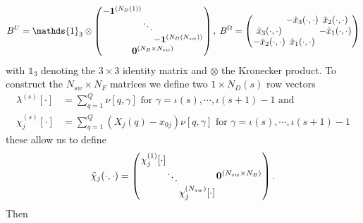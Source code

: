 \begin{equation*}
\arraycolsep=0.4pt\def\arraystretch{1}
    B^U = \mathds{1}_{3} \otimes \left(\begin{array}{c}
         \begin{array}{ccc}
             -\bm{1}^{(N_D(1))} & & \\
              & \ddots & \\
              & & -\bm{1}^{(N_D(N_{sw}))}
         \end{array}\\
         \bm{0}^{(N_B \times N_{sw})}
    \end{array}\right), \;
    B^\Omega =
    \left(\begin{array}{ccc}
             & -\tilde{x}_3(\cdot,\cdot) & \tilde{x}_2(\cdot,\cdot)\\
            \tilde{x}_3(\cdot,\cdot) & & -\tilde{x}_1(\cdot,\cdot)\\
            -\tilde{x}_2(\cdot,\cdot) & \tilde{x}_1(\cdot,\cdot) &
          \end{array}\right)
\end{equation*}
with $\mathds{1}_{3}$ denoting the $3\times3$ identity matrix and $\otimes$ the Kronecker product.
To construct the $N_{sw} \times N_F$ matrices we define two $1 \times N_D(s)$ row vectors
\begin{equation*}
\begin{aligned}
    \lambda^{(s)}[\cdot] &= \sum_{q=1}^Q \nu[q,\gamma] \text{ for } \gamma = \iota(s),\cdots,\iota(s+1)-1 \text{ and } \\
    \chi_j^{(s)}[\cdot] &= \sum_{q=1}^{Q} (X_j(q) - x_{0 j})\nu[q,\gamma] \text{ for } \gamma = \iota(s),\cdots,\iota(s+1)-1
\end{aligned}
\end{equation*}
these allow us to define
\begin{equation*}
\arraycolsep=0.4pt\def\arraystretch{1}
    \tilde{\chi}_j(\cdot,\cdot)=\left(\begin{array}{cc}
         \begin{array}{ccc}
             \chi_j^{(1)}[\cdot] & & \\
              & \ddots & \\
              & & \chi_j^{(N_{sw})}[\cdot]
         \end{array} & \bm{0}^{(N_{sw} \times N_B)}
    \end{array}\right).
\end{equation*}
Then
